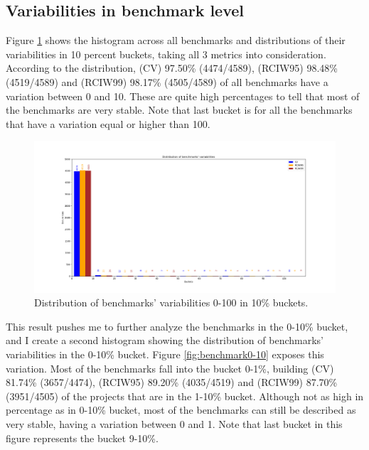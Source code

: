 \documentclass{seal_thesis}
\begin{document}
\subsection{Variabilities in benchmark level}

Figure \ref{fig:benchmark0-100} shows the histogram across all benchmarks and distributions of their variabilities in 10 percent buckets, taking all 3 metrics into consideration. According to the distribution, (CV) 97.50\% (4474/4589), (RCIW95) 98.48\% (4519/4589) and (RCIW99) 98.17\% (4505/4589) of all benchmarks have a variation between 0 and 10. These are quite high percentages to tell that most of the benchmarks are very stable. Note that last bucket is for all the benchmarks that have a variation equal or higher than 100.

\begin{figure}[H]
	\centering
	\includegraphics[width=\linewidth]{benchmarks0-100}
	\caption{Distribution of benchmarks' variabilities 0-100 in 10\% buckets.}
	\label{fig:benchmark0-100}
\end{figure}

\noindent This result pushes me to further analyze the benchmarks in the 0-10\% bucket, and I create a second histogram showing the distribution of benchmarks' variabilities in the 0-10\% bucket. Figure \ref{fig:benchmark0-10} exposes this variation. Most of the benchmarks fall into the bucket 0-1\%, building (CV) 81.74\% (3657/4474), (RCIW95) 89.20\% (4035/4519) and (RCIW99) 87.70\% (3951/4505) of the projects that are in the 1-10\% bucket. Although not as high in percentage as in 0-10\% bucket, most of the benchmarks can still be described as very stable, having a variation between 0 and 1. Note that last bucket in this figure represents the bucket 9-10\%.
\end{document}
